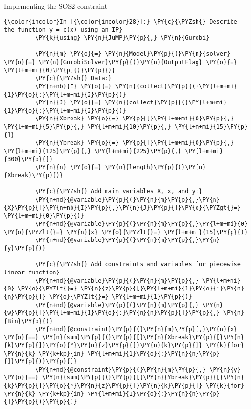 Implementing the SOS2 constraint.
\begin{codeCell}
\label{code:pwl-application}


    \begin{Verbatim}[commandchars=\\\{\}]
{\color{incolor}In [{\color{incolor}28}]:} \PY{c}{\PYZsh{} Describe the function y = c(x) using an IP}
         \PY{k}{using} \PY{n}{JuMP}\PY{p}{,} \PY{n}{Gurobi}
         
         \PY{n}{m} \PY{o}{=} \PY{n}{Model}\PY{p}{(}\PY{n}{solver} \PY{o}{=} \PY{n}{GurobiSolver}\PY{p}{(}\PY{n}{OutputFlag} \PY{o}{=} \PY{l+m+mi}{0}\PY{p}{)}\PY{p}{)}
         \PY{c}{\PYZsh{} Data:}
         \PY{n+nb}{I} \PY{o}{=} \PY{n}{collect}\PY{p}{(}\PY{l+m+mi}{1}\PY{o}{:}\PY{l+m+mi}{2}\PY{p}{)}
         \PY{n}{J} \PY{o}{=} \PY{n}{collect}\PY{p}{(}\PY{l+m+mi}{1}\PY{o}{:}\PY{l+m+mi}{2}\PY{p}{)}
         \PY{n}{Xbreak} \PY{o}{=} \PY{p}{[}\PY{l+m+mi}{0}\PY{p}{,} \PY{l+m+mi}{5}\PY{p}{,} \PY{l+m+mi}{10}\PY{p}{,} \PY{l+m+mi}{15}\PY{p}{]}
         \PY{n}{Ybreak} \PY{o}{=} \PY{p}{[}\PY{l+m+mi}{0}\PY{p}{,} \PY{l+m+mi}{125}\PY{p}{,} \PY{l+m+mi}{225}\PY{p}{,} \PY{l+m+mi}{300}\PY{p}{]}
         \PY{n}{n} \PY{o}{=} \PY{n}{length}\PY{p}{(}\PY{n}{Xbreak}\PY{p}{)}
    
         \PY{c}{\PYZsh{} Add main variables X, x, and y:}
         \PY{n+nd}{@variable}\PY{p}{(}\PY{n}{m}\PY{p}{,}\PY{n}{X}\PY{p}{[}\PY{n+nb}{I}\PY{p}{,}\PY{n}{J}\PY{p}{]}\PY{o}{\PYZgt{}=} \PY{l+m+mi}{0}\PY{p}{)}
         \PY{n+nd}{@variable}\PY{p}{(}\PY{n}{m}\PY{p}{,}\PY{l+m+mi}{0} \PY{o}{\PYZlt{}=} \PY{n}{x} \PY{o}{\PYZlt{}=} \PY{l+m+mi}{15}\PY{p}{)}
         \PY{n+nd}{@variable}\PY{p}{(}\PY{n}{m}\PY{p}{,}\PY{n}{y}\PY{p}{)}
         
         \PY{c}{\PYZsh{} Add constraints and variables for piecewise linear function}
         \PY{n+nd}{@variable}\PY{p}{(}\PY{n}{m}\PY{p}{,} \PY{l+m+mi}{0} \PY{o}{\PYZlt{}=} \PY{n}{z}\PY{p}{[}\PY{l+m+mi}{1}\PY{o}{:}\PY{n}{n}\PY{p}{]} \PY{o}{\PYZlt{}=} \PY{l+m+mi}{1}\PY{p}{)}
         \PY{n+nd}{@variable}\PY{p}{(}\PY{n}{m}\PY{p}{,} \PY{n}{w}\PY{p}{[}\PY{l+m+mi}{1}\PY{o}{:}\PY{n}{n}\PY{p}{]}\PY{p}{,} \PY{n}{Bin}\PY{p}{)}
         \PY{n+nd}{@constraint}\PY{p}{(}\PY{n}{m}\PY{p}{,}\PY{n}{x} \PY{o}{==} \PY{n}{sum}\PY{p}{(}\PY{p}{[}\PY{n}{Xbreak}\PY{p}{[}\PY{n}{k}\PY{p}{]}\PY{o}{*}\PY{n}{z}\PY{p}{[}\PY{n}{k}\PY{p}{]} \PY{k}{for} \PY{n}{k} \PY{k+kp}{in} \PY{l+m+mi}{1}\PY{o}{:}\PY{n}{n}\PY{p}{]}\PY{p}{)}\PY{p}{)}
         \PY{n+nd}{@constraint}\PY{p}{(}\PY{n}{m}\PY{p}{,} \PY{n}{y} \PY{o}{==} \PY{n}{sum}\PY{p}{(}\PY{p}{[}\PY{n}{Ybreak}\PY{p}{[}\PY{n}{k}\PY{p}{]}\PY{o}{*}\PY{n}{z}\PY{p}{[}\PY{n}{k}\PY{p}{]} \PY{k}{for} \PY{n}{k} \PY{k+kp}{in} \PY{l+m+mi}{1}\PY{o}{:}\PY{n}{n}\PY{p}{]}\PY{p}{)}\PY{p}{)}
         

\end{Verbatim}
\end{codeCell}
